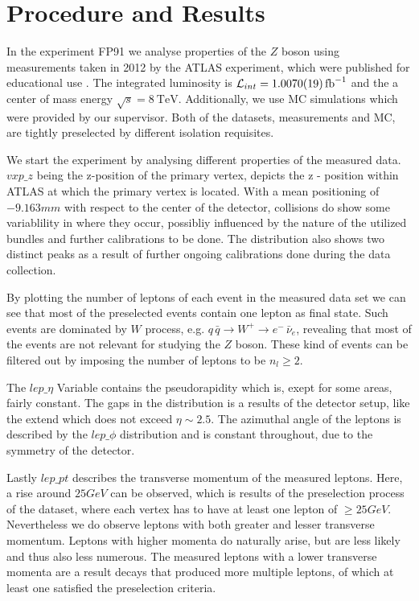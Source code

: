 \documentclass[11 pt]{article}
\begin{document}
\section{Procedure and Results}
In the experiment FP91 we analyse properties of the $Z$ boson using measurements taken in 2012 by the ATLAS experiment, which were published for educational use \footnotemark {} \footnotemark {}. The integrated luminosity is $\mathcal{L}_{int} = \SI{1.007\pm 0.0019}{\femto\barn^{-1}}$ and the a center of mass energy $\sqrt{s} = \SI{8}{\tera\electronvolt}$. Additionally, we use MC simulations which were provided by our supervisor. Both of the datasets, measurements and MC, are tightly preselected by different isolation requisites.

We start the experiment by analysing different properties of the measured data. $vxp\_z$ being the z-position of the primary vertex, depicts the z - position within ATLAS at which the primary vertex is located. With a mean positioning of $-9.163mm$ with respect to the center of the detector, collisions do show some variablility in where they occur, possibliy influenced by the nature of the utilized bundles and further calibrations to be done. The distribution also shows two distinct peaks as a result of further ongoing calibrations done during the data collection.

By plotting the number of leptons of each event in the measured data set we can see that most of the preselected events contain one lepton as final state. Such events are dominated by $W$ process, e.g. $q\, \bar{q} \to W^+ \to e^-\, \bar{\nu}_e$, revealing that most of the events are not relevant for studying the $Z$ boson. These kind of events can be filtered out by imposing the number of leptons to be $n_l \geq 2$. 

The $lep\_\eta$ Variable contains the pseudorapidity which is, exept for some areas, fairly constant. The gaps in the distribution is a results of the detector setup, like the extend which does not exceed $\eta \sim 2.5 $.
The azimuthal angle of the leptons is described by the $lep\_\phi$ distribution and is constant throughout, due to the symmetry of the detector.

Lastly $lep\_pt$ describes the transverse momentum of the measured leptons. Here, a rise around $25GeV$ can be observed, which is results of the preselection process of the dataset, where each vertex has to have at least one lepton of $\geq25GeV$. Nevertheless we do observe leptons with both greater and lesser transverse momentum. Leptons with higher momenta do naturally arise, but are less likely and thus also less numerous. The measured leptons with a lower transverse momenta are a result decays that produced more multiple leptons, of which at least one satisfied the preselection criteria.
\end{document}
